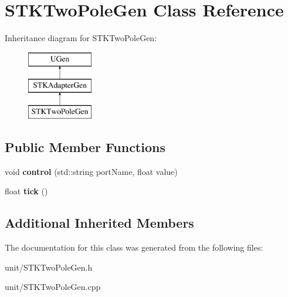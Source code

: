 \hypertarget{classSTKTwoPoleGen}{}\section{S\+T\+K\+Two\+Pole\+Gen Class Reference}
\label{classSTKTwoPoleGen}
Inheritance diagram for S\+T\+K\+Two\+Pole\+Gen\+:\begin{figure}[H]
\begin{center}
\leavevmode
\includegraphics[height=3.000000cm]{classSTKTwoPoleGen}
\end{center}
\end{figure}
\subsection*{Public Member Functions}
\begin{DoxyCompactItemize}
\item 
void {\bfseries control} (std\+::string port\+Name, float value)\hypertarget{classSTKTwoPoleGen_a71b904b3c03c69f5fb25bbf2449fb802}{}\label{classSTKTwoPoleGen_a71b904b3c03c69f5fb25bbf2449fb802}

\item 
float {\bfseries tick} ()\hypertarget{classSTKTwoPoleGen_ade033932ab7e85b7f3d6a69461eef372}{}\label{classSTKTwoPoleGen_ade033932ab7e85b7f3d6a69461eef372}

\end{DoxyCompactItemize}
\subsection*{Additional Inherited Members}


The documentation for this class was generated from the following files\+:\begin{DoxyCompactItemize}
\item 
unit/S\+T\+K\+Two\+Pole\+Gen.\+h\item 
unit/S\+T\+K\+Two\+Pole\+Gen.\+cpp\end{DoxyCompactItemize}
